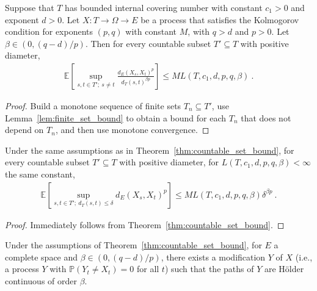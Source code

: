 \begin{theorem}\label{thm:countable_set_bound}
  \leanok
Suppose that $T$ has bounded internal covering number with constant $c_1>0$ and exponent $d > 0$.
Let $X : T \to \Omega \to E$ be a process that satisfies the Kolmogorov condition for exponents $(p,q)$ with constant $M$, with $q > d$ and $p > 0$.
Let $\beta \in(0, (q - d)/p)$.
Then for every countable subset $T' \subseteq T$ with positive diameter,
\begin{align*}
  \mathbb{E}\left[ \sup_{s, t \in T';\: s \ne t} \frac{d_E(X_s, X_t)^p}{d_T(s, t)^{\beta p}} \right]
  \le M L(T, c_1, d, p, q, \beta)
  \: .
\end{align*}
\end{theorem}

\begin{proof}
Build a monotone sequence of finite sets $T_n \subseteq T'$, use Lemma~\ref{lem:finite_set_bound} to obtain a bound for each $T_n$ that does not depend on $T_n$, and then use monotone convergence.
\end{proof}


\begin{corollary}\label{cor:countable_set_bound_of_le}
Under the same assumptions as in Theorem~\ref{thm:countable_set_bound}, for every countable subset $T' \subseteq T$ with positive diameter, for $L(T, c_1, d, p, q, \beta) < \infty$ the same constant,
\begin{align*}
  \mathbb{E}\left[ \sup_{s, t \in T';\: d_T(s, t) \le \delta} d_E(X_s, X_t)^p \right]
  \le M L(T, c_1, d, p, q, \beta) \delta^{\beta p}
  \: .
\end{align*}
\end{corollary}

\begin{proof}
Immediately follows from Theorem~\ref{thm:countable_set_bound}.
\end{proof}


\begin{lemma}\label{lem:holder_modification_single}
  \leanok
Under the assumptions of Theorem~\ref{thm:countable_set_bound}, for $E$ a complete space and $\beta \in (0, (q - d)/p)$, there exists a modification $Y$ of $X$ (i.e., a process $Y$ with $\mathbb{P}(Y_t \ne X_t) = 0$ for all $t$) such that the paths of $Y$ are Hölder continuous of order $\beta$.
\end{lemma}

